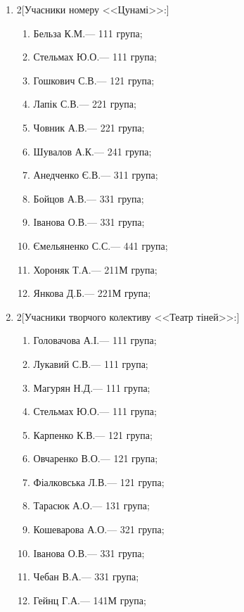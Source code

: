 \documentclass[
	a4paper,
	12pt,
	oneside,
	draft
]{extreport}
\begin{document}
\begin{enumerate}[topsep=0pt,itemsep=-1ex,partopsep=0ex,parsep=1ex]
\item 
\begin{multicols}{2}[Учасники номеру <<Цунамі>>:] 
\begin{enumerate}[topsep=0pt,itemsep=-1ex,partopsep=0ex,parsep=1ex,label=\arabic*.]
\item Бельза К.М.\hfill --- 111 група;
\item Стельмах Ю.О.\hfill --- 111 група;
\item Гошкович С.В.\hfill --- 121 група;
\item Лапік С.В.\hfill --- 221 група;
\item Човник А.В.\hfill --- 221 група;
\item Шувалов А.К.\hfill --- 241 група;
\item Анедченко Є.В.\hfill --- 311 група;
\item Бойцов А.В.\hfill --- 331 група;
\item Іванова О.В.\hfill --- 331 група;
\item Ємельяненко С.С.\hfill --- 441 група;
\item Хороняк Т.А.\hfill --- 211М група;
\item Янкова Д.Б.\hfill --- 221М група;
\end{enumerate}
\end{multicols}

\newpage
\item 
\begin{multicols}{2}[Учасники творчого колективу <<Театр тіней>>:] 
\begin{enumerate}[topsep=0pt,itemsep=-1ex,partopsep=0ex,parsep=1ex,label=\arabic*.]
\item Головачова А.І.\hfill --- 111 група;
\item Лукавий С.В.\hfill --- 111 група;
\item Магурян Н.Д.\hfill --- 111 група;
\item Стельмах Ю.О.\hfill --- 111 група;
\item Карпенко К.В.\hfill --- 121 група;
\item Овчаренко В.О.\hfill --- 121 група;
\item Фіалковська Л.В.\hfill --- 121 група;
\item Тарасюк А.О.\hfill --- 131 група;
\item Кошеварова А.О.\hfill --- 321 група;
\item Іванова О.В.\hfill --- 331 група;
\item Чебан В.А.\hfill --- 331 група;
\item Гейнц Г.А.\hfill --- 141М група;
\end{enumerate}
\end{multicols}


\end{enumerate}
\end{document}
